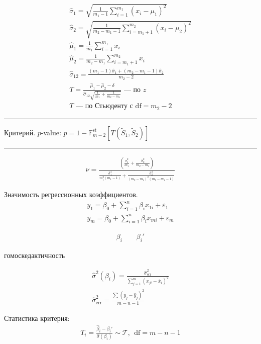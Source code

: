 \documentclass{book}
\begin{document}
\begin{gather*}
  \hat{\sigma}_1=\sqrt{\frac{1}{m_1-1}\sum_{i=1}^{m_1} {(x_i-\mu_1)^2}}\\
  \hat{\sigma}_2=\sqrt{\frac{1}{m_2-m_1-1}\sum_{i=m_1+1}^{m_2} {(x_i-\mu_2)^2}}\\
  \hat{\mu}_1=\frac{1}{m_1}\sum_{i=1}^{m_1} {x_i}\\
  \hat{\mu}_2=\frac{1}{m_2-m_1}\sum_{i=m_1+1}^{m_2} {x_i}\\
  \hat{\sigma}_{12}=\frac{(m_1-1)\hat{\sigma}_1+(m_2-m_1-1)\hat{\sigma}_2}{m_2-2}\\
  T=\frac{\hat{\mu}_1-\hat{\mu}_2-\delta}{\hat{\sigma}_{12}\sqrt{\frac{1}{m_1}+\frac{1}{m_2-m_1}}}\textrm{ --- по $z$}\\
  T \textrm{ --- по Стьюденту с $\mathrm{df}=m_2-2$}
\end{gather*}

\hrule

Критерий. $p$-value: $p=1-\mathbb{F}^\textrm{st}_{m-2}[T(\tilde{S}_1, \tilde{S}_2)]$

\hrule

\begin{gather*}
  \nu=\frac{\left(\frac{\hat{\sigma}_1^2}{m_1}+\frac{\hat{\sigma}_2^2}{m_2-m_1}\right)}{\frac{\hat{\sigma}_1^4}{m_1^2(m_1-1)}+\frac{\hat{\sigma}_2^4}{(m_2-m_1)^2(m_2-m_1-1)}}
\end{gather*}

Значимость регрессионных коэффициентов.
\begin{gather*}
  y_1=\beta_0+\sum_{i=1}^{n} {\beta_ix_{1i}}+\varepsilon_1\\
  y_m=\beta_0+\sum_{i=1}^{n} {\beta_ix_{mi}}+\varepsilon_m
\end{gather*}

\begin{gather*}
  \beta_i~~~~~~~~~\beta_i'
\end{gather*}

гомоскедактичность

\begin{gather*}
    \hat{\sigma}^2(\beta_i)=\frac{\hat{\sigma}^2_\textrm{err}}{\sum_{j=1}^{m} {(x_{ji}-\overline{x}_i)^2}}\\
    \hat{\sigma}^2_\textrm{err}=\frac{\sum_{}^{} {(y_j-\hat{y}_j)^2}}{m-n-1}
\end{gather*}

Статистика критерия:
\begin{gather*}
    T_i =\frac{\hat{\beta}_i-\beta_i'}{\hat{\sigma}(\beta_i)} \sim \mathcal{T},~~ \mathrm{df}=m-n-1
\end{gather*}
\end{document}
